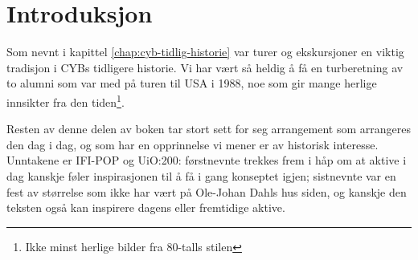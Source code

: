 \chapter*{Introduksjon}

\setcounter{footnote}{0}

Som nevnt i kapittel \ref{chap:cyb-tidlig-historie} var turer og ekskursjoner en viktig tradisjon i CYBs tidligere historie. Vi har vært så heldig å få en turberetning av to alumni som var med på turen til USA i 1988, noe som gir mange herlige innsikter fra den tiden\footnote{Ikke minst herlige bilder fra 80-talls stilen}.

Resten av denne delen av boken tar stort sett for seg arrangement som arrangeres den dag i dag, og som har en opprinnelse vi mener er av historisk interesse. Unntakene er IFI-POP og UiO:200: førstnevnte trekkes frem i håp om at aktive i dag kanskje føler inspirasjonen til å få i gang konseptet igjen; sistnevnte var en fest av størrelse som ikke har vært på Ole-Johan Dahls hus siden, og kanskje den teksten også kan inspirere dagens eller fremtidige aktive.
